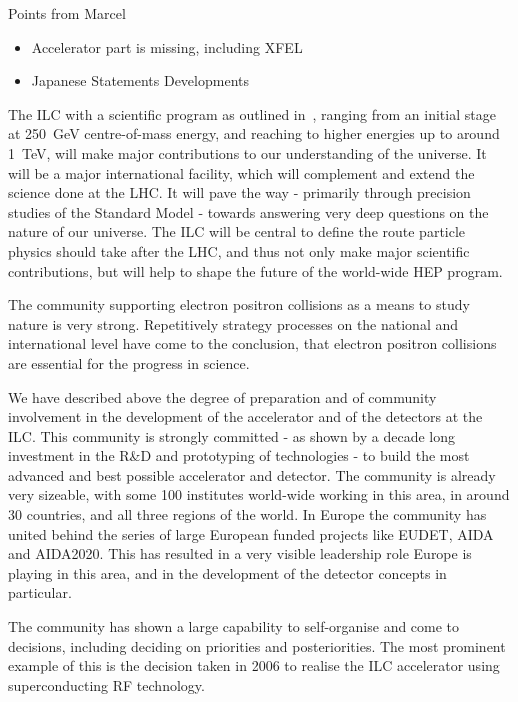 \documentclass[%
 reprint,
 floatfix,
 amsmath,amssymb,
 aps,
]{revtex4-1}
\begin{document}
Points from Marcel
\begin{itemize}
    \item Accelerator part is missing, including XFEL
    \item Japanese Statements Developments
\end{itemize}




The ILC with a scientific program as outlined in~\cite{ILCESU1}, ranging from 
an initial stage at 250~GeV centre-of-mass energy, and reaching to higher 
energies up to around 1~TeV, will make major contributions to our understanding 
of the universe. It will be a major international facility, which will 
complement and extend the science done at the LHC. It will pave the way - 
primarily through precision studies of the Standard Model - towards answering 
very deep questions on the nature of our universe. The ILC will be central to 
define the route particle physics should take after the LHC, and thus not only 
make major scientific contributions, but will help to shape the future of the 
world-wide HEP program. 

The community supporting electron positron collisions as a means to study nature 
is very strong. Repetitively strategy processes on the national and 
international level have come to the conclusion, that electron positron 
collisions are essential for the progress in science. 

We have described above the degree of preparation and of community involvement 
in the development of the accelerator and of the detectors at the ILC. This 
community is strongly committed - as shown by a decade long investment in the 
R\&D and prototyping of technologies - to build the most advanced and best 
possible accelerator and detector. The community is already very sizeable, with 
some 100 institutes world-wide working in this area, in around 30 countries, and 
all three regions of the world. In Europe the community has united behind the 
series of large European funded projects like EUDET, AIDA and AIDA2020. This has 
resulted in a very visible leadership role Europe is playing in this area, and 
in the development of the detector concepts in particular. 

The community has shown a large capability to self-organise and come to 
decisions, including deciding on priorities and posteriorities. The most 
prominent example of this is the decision taken in 2006 to realise the ILC 
accelerator using superconducting RF technology. 
\end{document}
